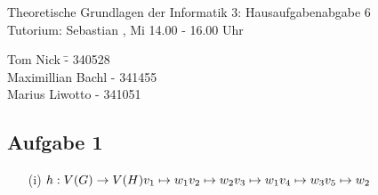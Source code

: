 \documentclass[a4paper,10pt]{article}
\begin{document}
\begin{center}
\Large{Theoretische Grundlagen der Informatik 3: Hausaufgabenabgabe 6} \\
\large{Tutorium: Sebastian , Mi 14.00 - 16.00 Uhr}
\end{center}
\begin{tabbing}
Tom Nick \hspace{2cm}\= - 340528\\
Maximillian Bachl \> - 341455 \\
Marius Liwotto\> -  341051
\end{tabbing}
\subsection*{Aufgabe 1}
\begin{enumerate}
	\item[(i)]
	\( h: V(G) \rightarrow V(H)\\
	v_1 \mapsto w_1 \\
	v_2 \mapsto w_2 \\
	v_3 \mapsto w_1 \\
	v_4 \mapsto w_3 \\
	v_5 \mapsto w_2 \)


\end{enumerate}
\end{document}
